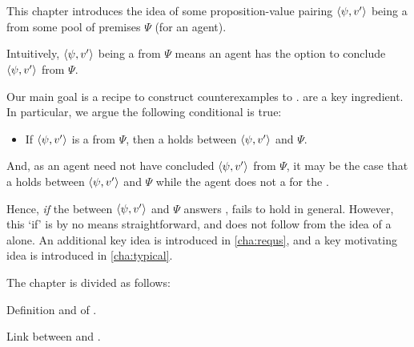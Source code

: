 \chapter{}
\label{cha:fcs}

\nocite{Ryle:1946tu}

\begin{note}
  This chapter introduces the idea of some proposition-value pairing \(\langle \psi, v' \rangle\) being a \emph{\fc{}} from some pool of premises \(\Psi\) (for an agent).

  Intuitively, \(\langle \psi, v' \rangle\) being a \fc{} from \(\Psi\) means an agent has the option to conclude \(\langle \psi, v' \rangle\) from \(\Psi\).
\end{note}

\begin{note}
  Our main goal is a recipe to construct counterexamples to \issueConstraint{}.
   are a key ingredient.
  In particular, we argue the following conditional is true:

  \begin{itemize}
  \item
    If \(\langle \psi, v' \rangle\) is a \fc{} from \(\Psi\), then a \ros{} holds between \(\langle \psi, v' \rangle\) and \(\Psi\).
  \end{itemize}

  And, as an agent need not have concluded \(\langle \psi, v' \rangle\) from \(\Psi\), it may be the case that a \ros{} holds between \(\langle \psi, v' \rangle\) and \(\Psi\) while the agent does not a \wit{} for the \ros{}.

  Hence, \emph{if} the \ros{} between \(\langle \psi, v' \rangle\) and \(\Psi\) answers \qWhyV{}, \issueConstraint{} fails to hold in general.
  However, this `if' is by no means straightforward, and does not follow from the idea of a \fc{} alone.
  An additional key idea is introduced in \autoref{cha:requs}, and a key motivating idea is introduced in \autoref{cha:typical}.
\end{note}

\begin{note}
  The chapter is divided as follows:
  \begin{TOCEnum}
  \item

    Definition and  of .
  \item

    Link between  and .
  \end{TOCEnum}
\end{note}


